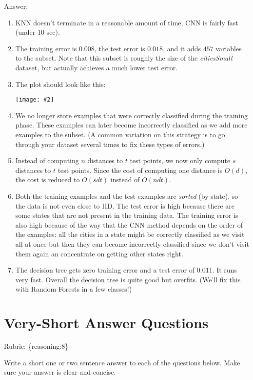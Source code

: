 \documentclass{article}
\def\ans#1{\par\gre{Answer: #1}}
\def\answer#1{\ans{#1}}
\def\rubric#1{\gre{Rubric: \{#1\}}}{}
\def\blu#1{{\color{blu}#1}}
\def\gre#1{{\color{gre}#1}}
\newcommand{\centerfig}[2]{\begin{center}\texttt{[image: \#2]}\end{center}}
\def\enum#1{\begin{enumerate}#1\end{enumerate}}
\begin{document}
\answer{
\enum{
\item KNN doesn't terminate in a reasonable amount of time, CNN is fairly fast (under 10 sec).
\item The training error is $0.008$, the test error is $0.018$, and it adds $457$ variables to the subset. Note that this subset is roughly the size of the \emph{citiesSmall} dataset, but actually achieves a much lower test error.
\item The plot should look like this:
\centerfig{0.7}{../figs/q4_2_cnnDecisionBoundary}
\item We no longer store  examples that were correctly classified during the training phase. These examples can later become incorrectly classified as we add more examples to the subset. (A common variation on this strategy is to go through your dataset several times to fix these types of errors.)
\item Instead of computing $n$ distances to $t$ test points, we now only compute $s$ distances to $t$ test points. Since the cost of computing one distance is $O(d)$, the cost is reduced to $O(sdt)$ instead of $O(ndt)$.
\item Both the training examples and the test examples are \emph{sorted} (by state), so the data is not even close to IID. The test error is high because there are some states that are not present in the training data. The training error is also high because of the way that the CNN method depends on the order of the examples: all the cities in a state might be correctly classified as we visit all at once but then they can become incorrectly classified since we don't visit them again an concentrate on getting other states right.
\item The decision tree gets zero training error and a test error of 0.011. It runs very fast. Overall the decision tree is quite good but overfits. (We'll fix this with Random Forests in a few classes!)
}
}



\section{Very-Short Answer Questions}
\rubric{reasoning:8}

\blu{Write a short one or two sentence answer to each of the questions below}. Make sure your answer is clear and concise.
\end{document}
